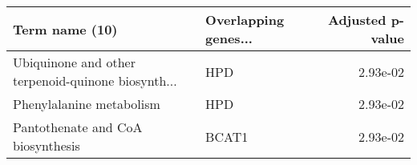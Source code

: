 \begin{tabular}{llr}
\toprule
                                    Term name (10) & Overlapping genes... &  Adjusted p-value \\
\midrule
Ubiquinone and other terpenoid-quinone biosynth... &                  HPD &          2.93e-02 \\
                          Phenylalanine metabolism &                  HPD &          2.93e-02 \\
                 Pantothenate and CoA biosynthesis &                BCAT1 &          2.93e-02 \\
\bottomrule
\end{tabular}
